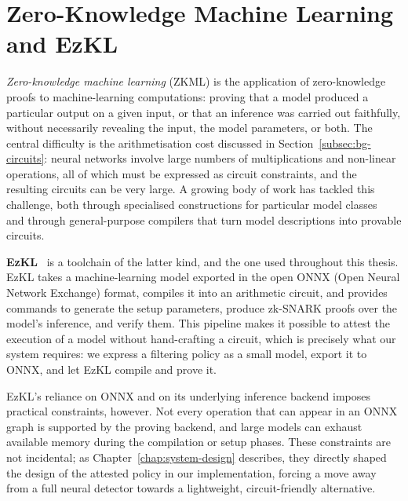 \section{Zero-Knowledge Machine Learning and EzKL}
\label{sec:bg-ezkl}

\emph{Zero-knowledge machine learning} (ZKML) is the application of zero-knowledge proofs to machine-learning computations: proving that a model produced a particular output on a given input, or that an inference was carried out faithfully, without necessarily revealing the input, the model parameters, or both. The central difficulty is the arithmetisation cost discussed in Section~\ref{subsec:bg-circuits}: neural networks involve large numbers of multiplications and non-linear operations, all of which must be expressed as circuit constraints, and the resulting circuits can be very large. A growing body of work has tackled this challenge, both through specialised constructions for particular model classes~\cite{liu2021zkcnn,lee2024vcnn} and through general-purpose compilers that turn model descriptions into provable circuits.

\medskip

\textbf{EzKL}~\cite{ezkl} is a toolchain of the latter kind, and the one used throughout this thesis. EzKL takes a machine-learning model exported in the open ONNX (Open Neural Network Exchange) format, compiles it into an arithmetic circuit, and provides commands to generate the setup parameters, produce zk-SNARK proofs over the model's inference, and verify them. This pipeline makes it possible to attest the execution of a model without hand-crafting a circuit, which is precisely what our system requires: we express a filtering policy as a small model, export it to ONNX, and let EzKL compile and prove it.

\medskip

EzKL's reliance on ONNX and on its underlying inference backend imposes practical constraints, however. Not every operation that can appear in an ONNX graph is supported by the proving backend, and large models can exhaust available memory during the compilation or setup phases. These constraints are not incidental; as Chapter~\ref{chap:system-design} describes, they directly shaped the design of the attested policy in our implementation, forcing a move away from a full neural detector towards a lightweight, circuit-friendly alternative.

